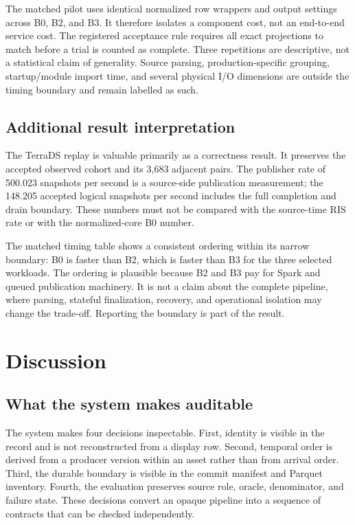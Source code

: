 The matched pilot uses identical normalized row wrappers and output settings across B0, B2, and B3. It therefore isolates a component cost, not an end-to-end service cost. The registered acceptance rule requires all exact projections to match before a trial is counted as complete. Three repetitions are descriptive, not a statistical claim of generality. Source parsing, production-specific grouping, startup/module import time, and several physical I/O dimensions are outside the timing boundary and remain labelled as such.

\subsection{Additional result interpretation}
The TerraDS replay is valuable primarily as a correctness result. It preserves the accepted observed cohort and its 3,683 adjacent pairs. The publisher rate of 500.023 snapshots per second is a source-side publication measurement; the 148.205 accepted logical snapshots per second includes the full completion and drain boundary. These numbers must not be compared with the source-time RIS rate or with the normalized-core B0 number.

The matched timing table shows a consistent ordering within its narrow boundary: B0 is faster than B2, which is faster than B3 for the three selected workloads. The ordering is plausible because B2 and B3 pay for Spark and queued publication machinery. It is not a claim about the complete pipeline, where parsing, stateful finalization, recovery, and operational isolation may change the trade-off. Reporting the boundary is part of the result.

\section{Discussion}
\subsection{What the system makes auditable}
The system makes four decisions inspectable. First, identity is visible in the record and is not reconstructed from a display row. Second, temporal order is derived from a producer version within an asset rather than from arrival order. Third, the durable boundary is visible in the commit manifest and Parquet inventory. Fourth, the evaluation preserves source role, oracle, denominator, and failure state. These decisions convert an opaque pipeline into a sequence of contracts that can be checked independently.

